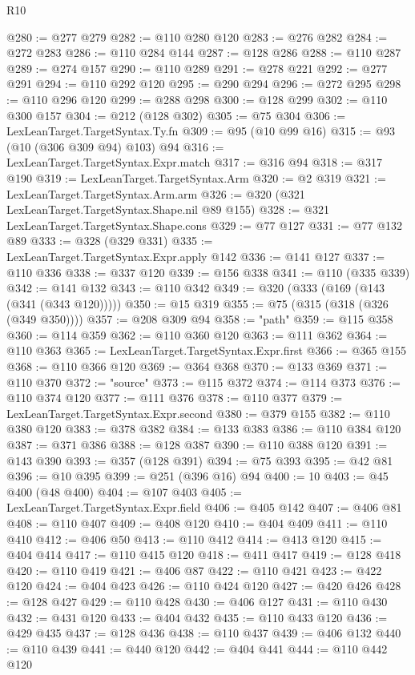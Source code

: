 \begin{lexlean}{R10}
\begin{coremodule}
@280 := @277 @279
@282 := @110 @280 @120
@283 := @276 @282
@284 := @272 @283
@286 := @110 @284 @144
@287 := @128 @286
@288 := @110 @287
@289 := @274 @157
@290 := @110 @289
@291 := @278 @221
@292 := @277 @291
@294 := @110 @292 @120
@295 := @290 @294
@296 := @272 @295
@298 := @110 @296 @120
@299 := @288 @298
@300 := @128 @299
@302 := @110 @300 @157
@304 := @212 (@128 @302)
@305 := @75 @304
@306 := LexLeanTarget.TargetSyntax.Ty.fn
@309 := @95 (@10 @99 @16)
@315 := @93 (@10 (@306 @309 @94) @103) @94
@316 := LexLeanTarget.TargetSyntax.Expr.match
@317 := @316 @94
@318 := @317 @190
@319 := LexLeanTarget.TargetSyntax.Arm
@320 := @2 @319
@321 := LexLeanTarget.TargetSyntax.Arm.arm
@326 := @320 (@321 LexLeanTarget.TargetSyntax.Shape.nil @89 @155)
@328 := @321 LexLeanTarget.TargetSyntax.Shape.cons
@329 := @77 @127
@331 := @77 @132 @89
@333 := @328 (@329 @331)
@335 := LexLeanTarget.TargetSyntax.Expr.apply @142
@336 := @141 @127
@337 := @110 @336
@338 := @337 @120
@339 := @156 @338
@341 := @110 (@335 @339)
@342 := @141 @132
@343 := @110 @342
@349 := @320 (@333 (@169 (@143 (@341 (@343 @120)))))
@350 := @15 @319
@355 := @75 (@315 (@318 (@326 (@349 @350))))
@357 := @208 @309 @94
@358 := "path"
@359 := @115 @358
@360 := @114 @359
@362 := @110 @360 @120
@363 := @111 @362
@364 := @110 @363
@365 := LexLeanTarget.TargetSyntax.Expr.first
@366 := @365 @155
@368 := @110 @366 @120
@369 := @364 @368
@370 := @133 @369
@371 := @110 @370
@372 := "source"
@373 := @115 @372
@374 := @114 @373
@376 := @110 @374 @120
@377 := @111 @376
@378 := @110 @377
@379 := LexLeanTarget.TargetSyntax.Expr.second
@380 := @379 @155
@382 := @110 @380 @120
@383 := @378 @382
@384 := @133 @383
@386 := @110 @384 @120
@387 := @371 @386
@388 := @128 @387
@390 := @110 @388 @120
@391 := @143 @390
@393 := @357 (@128 @391)
@394 := @75 @393
@395 := @42 @81
@396 := @10 @395
@399 := @251 (@396 @16) @94
@400 := 10
@403 := @45 @400 (@48 @400)
@404 := @107 @403
@405 := LexLeanTarget.TargetSyntax.Expr.field
@406 := @405 @142
@407 := @406 @81
@408 := @110 @407
@409 := @408 @120
@410 := @404 @409
@411 := @110 @410
@412 := @406 @50
@413 := @110 @412
@414 := @413 @120
@415 := @404 @414
@417 := @110 @415 @120
@418 := @411 @417
@419 := @128 @418
@420 := @110 @419
@421 := @406 @87
@422 := @110 @421
@423 := @422 @120
@424 := @404 @423
@426 := @110 @424 @120
@427 := @420 @426
@428 := @128 @427
@429 := @110 @428
@430 := @406 @127
@431 := @110 @430
@432 := @431 @120
@433 := @404 @432
@435 := @110 @433 @120
@436 := @429 @435
@437 := @128 @436
@438 := @110 @437
@439 := @406 @132
@440 := @110 @439
@441 := @440 @120
@442 := @404 @441
@444 := @110 @442 @120

\end{coremodule}
\end{lexlean}
